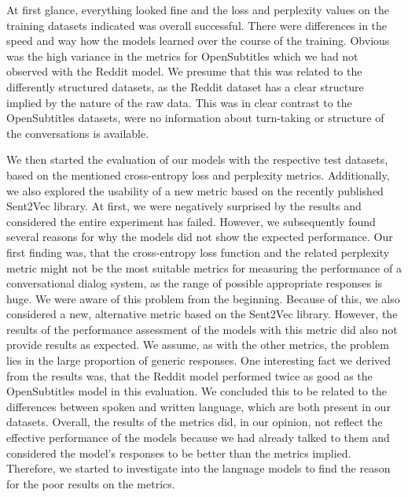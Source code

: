 At first glance, everything looked fine and the loss and perplexity values on the training datasets indicated was overall successful. There were differences in the speed and way how the models learned over the course of the training. Obvious was the high variance in the metrics for OpenSubtitles which we had not observed with the Reddit model. We presume that this was related to the differently structured datasets, as the Reddit dataset has a clear structure implied by the nature of the raw data. This was in clear contrast to the OpenSubtitles datasets, were no information about turn-taking or structure of the conversations is available.

We then started the evaluation of our models with the respective test datasets, based on the mentioned cross-entropy loss and perplexity metrics. Additionally, we also explored the usability of a new metric based on the recently published Sent2Vec library. At first, we were negatively surprised by the results and considered the entire experiment has failed. However, we subsequently found several reasons for why the models did not show the expected performance. Our first finding was, that the cross-entropy loss function and the related perplexity metric might not be the most suitable metrics for measuring the performance of a conversational dialog system, as the range of possible appropriate responses is huge. We were aware of this problem from the beginning. Because of this, we also considered a new, alternative metric based on the Sent2Vec library. However, the results of the performance assessment of the models with this metric did also not provide results as expected. We assume, as with the other metrics, the problem lies in the large proportion of generic responses. One interesting fact we derived from the results was, that the Reddit model performed twice as good as the OpenSubtitles model in this evaluation. We concluded this to be related to the differences between spoken and written language, which are both present in our datasets. Overall, the results of the metrics did, in our opinion, not reflect the effective performance of the models because we had already talked to them and considered the model's responses to be better than the metrics implied. Therefore, we started to investigate into the language models to find the reason for the poor results on the metrics.


